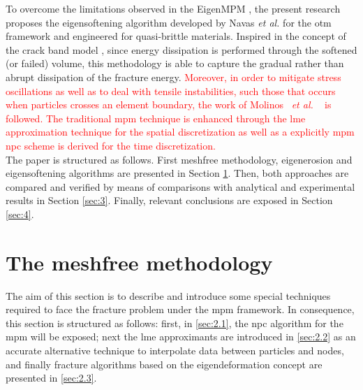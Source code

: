 \message{ !name(2020_EFM_MPM_Eigensoftening.tex)}\documentclass[preprint,12pt,a4paper]{elsarticle}
\newcommand{\etal}{
  \textit{et al.}
}
\newcommand{\PNA}[1]{
  \textcolor{red}{{#1}}
}
\begin{document}
To overcome the limitations observed in the EigenMPM
\cite{Zhang_EE_2020}, the present research proposes the eigensoftening
algorithm developed by Navas {\it et al.}
\cite{Navas_2017_ES,Navas2018a} for the \acrshort{otm} framework and
engineered for quasi-brittle materials. Inspired in the concept of the
crack band model \cite{Bazant83}, since energy dissipation is performed through the softened (or failed) volume, this methodology is able to capture the gradual rather than abrupt
dissipation of the fracture energy. \PNA{Moreover, in order to mitigate stress
oscillations as well as to deal with tensile instabilities, such those that
occurs when particles crosses an element boundary, the work of Molinos~\etal~\cite{Molinos2020} is followed. The traditional \acrshort{mpm} technique is enhanced through the \acrfull{lme} approximation technique
\cite{Arroyo2006} for the spatial discretization as well as a explicitly \acrshort{mpm} \acrfull{npc} scheme is derived for the time discretization.}\\

The paper is structured as follows. First meshfree methodology,
eigenerosion and eigensoftening algorithms are presented in Section
\ref{sec:2}. Then, both approaches are compared and verified by means of
comparisons with analytical and experimental results in Section
\ref{sec:3}. Finally, relevant conclusions are exposed in Section \ref{sec:4}.

\section{The meshfree methodology}
\label{sec:2}

The aim of this section is to describe and introduce some special
techniques required to face the fracture problem under the \acrshort{mpm}
framework. In consequence, this section is structured as follows: first, in
\ref{sec:2.1}, the \acrfull{npc} algorithm for the \acrshort{mpm}
will be exposed; next the \acrshort{lme} approximants are
introduced in \ref{sec:2.2} as an accurate alternative technique to
interpolate data between particles and nodes, and finally fracture
algorithms based on the eigendeformation concept are presented in
\ref{sec:2.3}.
\end{document}
